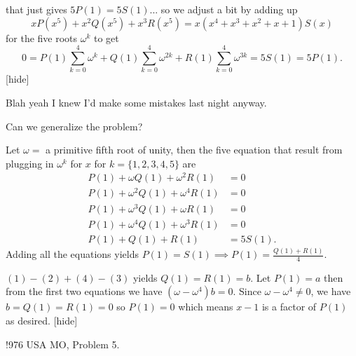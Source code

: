 \begin{solution}that just gives $ 5P(1) = 5S(1)$... so we adjust a bit by adding up\[ x P(x^5) + x^2 Q(x^5) + x^3 R(x^5) = x(x^4 + x^3 + x^2 + x + 1) S(x)\]for the five roots $ \omega^k$ to get
\[ 0 = P(1)\sum_{k = 0}^{4}{\omega^k} + Q(1)\sum_{k = 0}^{4}{\omega^{2k}} + R(1)\sum_{k = 0}^{4}{\omega^{3k}} = 5S(1) = 5P(1).\]
[\/hide]
\end{solution}



\begin{solution}
	Blah yeah I knew I'd make some mistakes last night anyway.
\end{solution}



\begin{solution}
	Can we generalize the problem?
\end{solution}



\begin{solution}
Let $\omega=$ a primitive fifth root of unity, then the five equation that result from plugging in $\omega^k$ for $x$ for $k=\{1, 2, 3, 4, 5\}$ are
\begin{align}
P(1)+\omega Q(1)+\omega^2 R(1)&=0 \\
P(1)+\omega^2 Q(1)+\omega^4 R(1)&=0\\
P(1)+\omega^3 Q(1)+\omega R(1)&=0\\
P(1)+\omega^4 Q(1)+\omega^3 R(1)&=0\\
P(1)+ Q(1)+ R(1)&=5S(1).
\end{align}
Adding all the equations yields $P(1)=S(1)\implies P(1)=\frac{Q(1)+R(1)}4$.

$(1)-(2)+(4)-(3)$ yields $Q(1)=R(1)=b$.  Let $P(1)=a$ then from the first two equations we have
$(\omega-\omega^4)b=0$.  Since $\omega-\omega^4\neq 0$, we have $b=Q(1)=R(1)=0$ so $P(1)=0$ which means $x-1$ is a factor of $P(1)$ as desired.
[\/hide]
\end{solution}



\begin{solution}
	!976 USA MO, Problem 5.
\end{solution}




